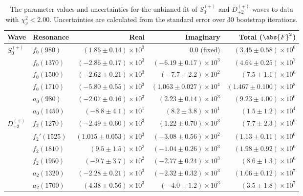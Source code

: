 \begin{table}[ht]
    \begin{center}
        \begin{tabular}{llrrr}\toprule
        Wave & Resonance & Real & Imaginary & Total ($\abs{F}^2$) \\\midrule
$S_{0}^{(+)}$ & $f_{0}(980)$ & $(1.86 \pm 0.14) \times 10^{3}$ & $0.0$ (fixed) & $(3.45 \pm 0.58) \times 10^{6}$ \\
 & $f_{0}(1370)$ & $(-2.86 \pm 0.17) \times 10^{3}$ & $(-6.19 \pm 0.17) \times 10^{3}$ & $(4.64 \pm 0.25) \times 10^{7}$ \\
 & $f_{0}(1500)$ & $(-2.62 \pm 0.21) \times 10^{3}$ & $(-7.7 \pm 2.2) \times 10^{2}$ & $(7.5 \pm 1.1) \times 10^{6}$ \\
 & $f_{0}(1710)$ & $(-5.80 \pm 0.55) \times 10^{3}$ & $(1.063 \pm 0.027) \times 10^{4}$ & $(1.467 \pm 0.100) \times 10^{8}$ \\
 & $a_{0}(980)$ & $(-2.07 \pm 0.16) \times 10^{3}$ & $(2.23 \pm 0.14) \times 10^{3}$ & $(9.23 \pm 1.00) \times 10^{6}$ \\
 & $a_{0}(1450)$ & $(-8.8 \pm 4.1) \times 10^{1}$ & $(8.2 \pm 3.8) \times 10^{1}$ & $(1.5 \pm 1.2) \times 10^{4}$ \\
$D_{+2}^{(+)}$ & $f_{2}(1270)$ & $(-2.49 \pm 0.60) \times 10^{3}$ & $(1.22 \pm 0.70) \times 10^{3}$ & $(7.7 \pm 2.3) \times 10^{6}$ \\
 & $f_{2}'(1525)$ & $(1.015 \pm 0.053) \times 10^{3}$ & $(-3.08 \pm 0.56) \times 10^{2}$ & $(1.13 \pm 0.11) \times 10^{6}$ \\
 & $f_{2}(1810)$ & $(9.5 \pm 1.5) \times 10^{2}$ & $(-1.04 \pm 0.26) \times 10^{3}$ & $(1.98 \pm 0.92) \times 10^{6}$ \\
 & $f_{2}(1950)$ & $(-9.7 \pm 3.7) \times 10^{2}$ & $(-2.77 \pm 0.24) \times 10^{3}$ & $(8.6 \pm 1.3) \times 10^{6}$ \\
 & $a_{2}(1320)$ & $(-2.28 \pm 0.21) \times 10^{3}$ & $(-2.32 \pm 0.32) \times 10^{3}$ & $(1.06 \pm 0.12) \times 10^{7}$ \\
 & $a_{2}(1700)$ & $(4.38 \pm 0.56) \times 10^{3}$ & $(-4.0 \pm 1.2) \times 10^{3}$ & $(3.5 \pm 1.8) \times 10^{7}$ \\\bottomrule
        \end{tabular}
    \caption{The parameter values and uncertainties for the unbinned fit of $S_{0}^{(+)}$ and $D_{+2}^{(+)}$ waves to data with $\chi^2_\nu < 2.00$. Uncertainties are calculated from the standard error over $30$ bootstrap iterations.}\label{tab:unbinned-fit-chisqdof-2.0-Sp0p-Dp2p}
    \end{center}
\end{table}
